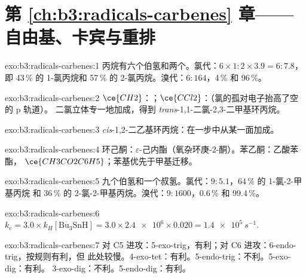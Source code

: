 \section*{第 \ref{ch:b3:radicals-carbenes} 章——自由基、卡宾与重排}

\begin{solution}{exo:b3:radicals-carbenes:1}
丙烷有六个伯氢和两个。氯代：$6 \times 1 : 2 \times 3.9 = 6 : 7.8$，
即 43\,\% 的 1-氯丙烷和 57\,\% 的 2-氯丙烷。溴代：$6 : 164$，4\,\% 和
96\,\%。
\end{solution}

\begin{solution}{exo:b3:radicals-carbenes:2}
$\ce{CH2}$：；$\ce{CCl2}$：（氯的孤对电子抬高了空的 p 轨道）。
二氯立体专一地加成，得到 \textit{trans}-1,1-二氯-2,3-二甲基环丙烷。
\end{solution}

\begin{solution}{exo:b3:radicals-carbenes:3}
\textit{cis}-1,2-二乙基环丙烷：在一步中从某一面加成。
\end{solution}

\begin{solution}{exo:b3:radicals-carbenes:4}
环己酮：$\varepsilon$-己内酯（氧杂环庚-2-酮）。苯乙酮：乙酸苯酯，
$\ce{CH3CO2C6H5}$；苯基优先于甲基迁移。
\end{solution}

\begin{solution}{exo:b3:radicals-carbenes:5}
九个伯氢和一个叔氢。氯代：$9 : 5.1$，64\,\% 的 1-氯-2-甲基丙烷
和 36\,\% 的 2-氯-2-甲基丙烷。溴代：$9 : 1600$，0.6\,\% 和 99.4\,\%。
\end{solution}

\begin{solution}{exo:b3:radicals-carbenes:6}
$k_c = 3.0 \times k_H[\mathrm{Bu_3SnH}] = 3.0 \times \num{2.4e6} \times 0.020 = \qty{1.4e5}{s^{-1}}$.
\end{solution}

\begin{solution}{exo:b3:radicals-carbenes:7}
对 C5 进攻：5-exo-trig，有利；对 C6 进攻：6-endo-trig，按规则有利，但
此处较慢。4-exo-tet：有利。5-endo-trig：不利。5-exo-dig：有利。
3-exo-dig：不利。5-endo-dig：有利。
\end{solution}

